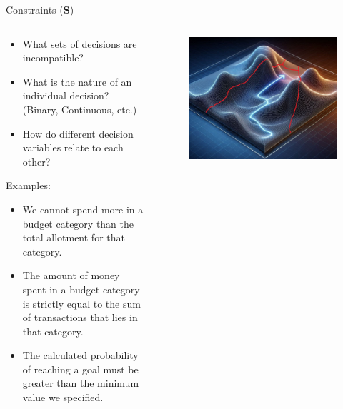 \documentclass[10pt, aspectratio=169]{beamer}
\begin{document}
\begin{frame}{Constraints ($\textbf{S}$)}
    \begin{columns}
        \begin{column}{0.5\textwidth}
            \begin{itemize}
                \item What sets of decisions are incompatible?
                \item What is the nature of an individual decision? (Binary, Continuous, etc.)
                \item How do different decision variables relate to each other?
            \end{itemize}
            Examples:
            \begin{itemize}
                \item We cannot spend more in a budget category than the total allotment for that category.
                \item The amount of money spent in a budget category is strictly equal to the sum of transactions that lies in that category.
                \item The calculated probability of reaching a goal must be greater than the minimum value we specified.
            \end{itemize}
        \end{column}
        \begin{column}{0.5\textwidth}
            \begin{figure}
                \includegraphics[width=0.8\linewidth]{MountainWithFences.jpg}
            \end{figure}
        \end{column}
    \end{columns}
\end{frame}
\end{document}
